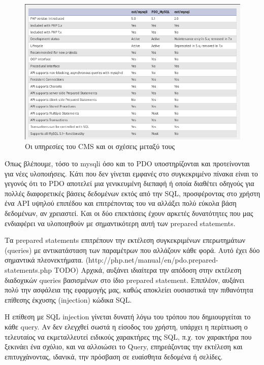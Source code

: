\documentclass[diploma]{softlab-thesis}
\begin{document}
\begin{figure}
  \centering
  \includegraphics[scale=0.4,trim=4 4 4 4,clip]{Figures/mysqlconnectors.png}
  \caption[Παράδειγμα χρήσης interactive generator script]{Οι υπηρεσίες του CMS και οι σχέσεις μεταξύ τους}
\end{figure}

\bigskip

Όπως βλέπουμε, τόσο το mysqli όσο και το PDO υποστηρίζονται και προτείνονται
για νέες υλοποιήσεις. Κάτι που δεν γίνεται εμφανές στο συγκεκριμένο πίνακα
είναι το γεγονός ότι το PDO αποτελεί μια γενικευμένη διεπαφή ή οποία διαθέτει
οδηγούς για πολλές διαφορετικές βάσεις δεδομένων εκτός από την SQL,
προσφέροντας στο χρήστη ένα API υψηλού επιπέδου και επιτρέποντας του να αλλάξει
πολύ εύκολα βάση δεδομένων, αν χρειαστεί. Και οι δύο επεκτάσεις έχουν αρκετές
δυνατότητες που μας ενδιαφέρει να υλοποιηθούν με σημαντικότερη αυτή των
prepared statements.

\bigskip

Τα prepared statements επιτρέπουν την εκτέλεση συγκεκριμένων επερωτημάτων
(queries) με αντικατάσταση των παραμέτρων που αλλάζουν κάθε φορά. Αυτό έχει δύο
σημαντικά πλεονεκτήματα. (http://php.net/manual/en/pdo.prepared-statements.php
TODO) Αρχικά, αυξάνει ιδιαίτερα την απόδοση στην εκτέλεση διαδοχικών queries
βασισμένων στο ίδιο prepared statement. Επιπλέον, αυξάνει πολύ την ασφάλεια της
εφαρμογής μας, καθώς αποκλείει ουσιαστικά την πιθανότητα επίθεσης έκχυσης
(injection) κώδικα SQL.

\bigskip

Η επίθεση με SQL injection γίνεται δυνατή λόγω του τρόπου που δημιουργείται το
κάθε query. Αν δεν ελεγχθεί σωστά η είσοδος του χρήστη, υπάρχει η περίπτωση ο
τελευταίος να εκμεταλλευτεί ειδικούς χαρακτήρες της SQL, π.χ. τον χαρακτήρα που
ξεκινάει ένα σχόλιο, και να αλλοιώσει το Query, επηρεάζοντας την εκτέλεση και
επιτυγχάνοντας, ιδανικά, την πρόσβαση σε ευαίσθητα δεδομένα ή σελίδες.
\end{document}
